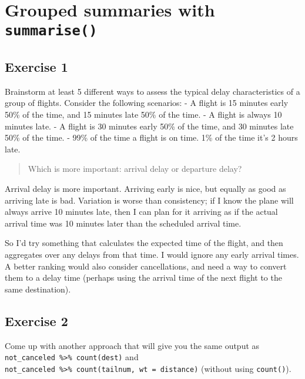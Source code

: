 \documentclass[]{book}
\theoremstyle{definition}
\theoremstyle{definition}
\theoremstyle{definition}
\theoremstyle{remark}
\begin{document}
\hypertarget{grouped-summaries-with-summarise}{%
\section{\texorpdfstring{Grouped summaries with
\texttt{summarise()}}{Grouped summaries with summarise()}}\label{grouped-summaries-with-summarise}}

\hypertarget{exercise-1-5}{%
\subsection{Exercise 1}\label{exercise-1-5}}

Brainstorm at least 5 different ways to assess the typical delay
characteristics of a group of flights. Consider the following scenarios:
- A flight is 15 minutes early 50\% of the time, and 15 minutes late
50\% of the time. - A flight is always 10 minutes late. - A flight is 30
minutes early 50\% of the time, and 30 minutes late 50\% of the time. -
99\% of the time a flight is on time. 1\% of the time it's 2 hours late.

\begin{quote}
Which is more important: arrival delay or departure delay?
\end{quote}

Arrival delay is more important. Arriving early is nice, but equally as
good as arriving late is bad. Variation is worse than consistency; if I
know the plane will always arrive 10 minutes late, then I can plan for
it arriving as if the actual arrival time was 10 minutes later than the
scheduled arrival time.

So I'd try something that calculates the expected time of the flight,
and then aggregates over any delays from that time. I would ignore any
early arrival times. A better ranking would also consider cancellations,
and need a way to convert them to a delay time (perhaps using the
arrival time of the next flight to the same destination).

\hypertarget{exercise-2-5}{%
\subsection{Exercise 2}\label{exercise-2-5}}

Come up with another approach that will give you the same output as
\texttt{not\_canceled\ \%\textgreater{}\%\ count(dest)} and
\texttt{not\_canceled\ \%\textgreater{}\%\ count(tailnum,\ wt\ =\ distance)}
(without using \texttt{count()}).
\end{document}
